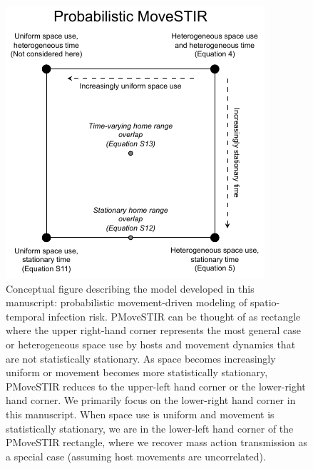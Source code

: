 \documentclass[letterpaper]{article}
\begin{document}
\begin{figure}
    \includegraphics[width=\textwidth]{figures/conceptual_figure_pmovestir.pdf}
    \caption{Conceptual figure describing the model developed in this manuscript: probabilistic movement-driven modeling of spatio-temporal infection risk. PMoveSTIR can be thought of as rectangle where the upper right-hand corner represents the most general case or heterogeneous space use by hosts and movement dynamics that are not statistically stationary.  As space becomes increasingly uniform or movement becomes more statistically stationary, PMoveSTIR reduces to the upper-left hand corner or the lower-right hand corner.  We primarily focus on the lower-right hand corner in this manuscript.  When space use is uniform and movement is statistically stationary, we are in the lower-left hand corner of the PMoveSTIR rectangle, where we recover mass action transmission as a special case (assuming host movements are uncorrelated).}
	\label{fig:square}
\end{figure}
\end{document}

